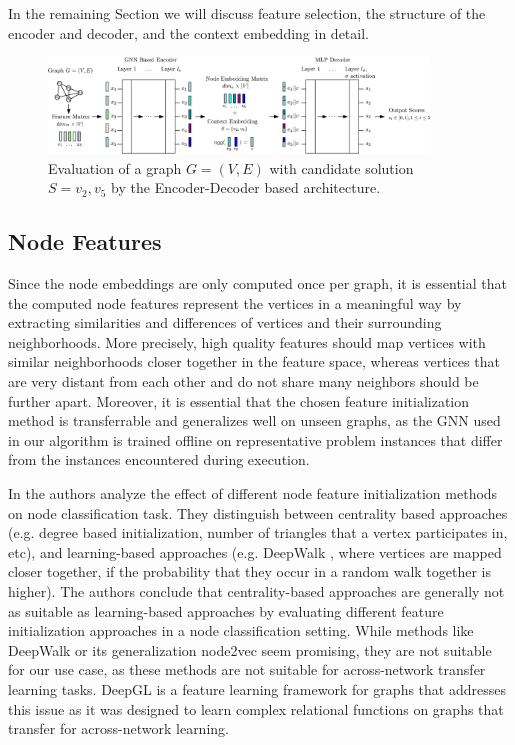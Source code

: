 \documentclass[draft,final]{vutinfth} %
\begin{document}
In the remaining Section we will discuss feature selection, the structure of the encoder and decoder, and the context embedding in detail. 

\begin{figure}
    \centering
    \includegraphics[width=0.9\textwidth]{graphics/gnn-architecture.eps}
    \caption{Evaluation of a graph $G = (V, E)$ with candidate solution $S = {v_2, v_5}$ by the Encoder-Decoder based architecture. }
    \label{fig:gnn-architecture}
\end{figure}

\subsection{Node Features}
Since the node embeddings are only computed once per graph, it is essential that the computed node features represent the vertices in a meaningful way by extracting similarities and differences of vertices and their surrounding neighborhoods. More precisely, high quality features should map vertices with similar neighborhoods closer together in the feature space, whereas vertices that are very distant from each other and do not share many neighbors should be further apart. Moreover, it is essential that the chosen feature initialization method is transferrable and generalizes well on unseen graphs, as the GNN used in our algorithm is trained offline on representative problem instances that differ from the instances encountered during execution. 

In \cite{Duong2019} the authors analyze the effect of different node feature initialization methods on node classification task. They distinguish between centrality based approaches (e.g. degree based initialization, number of triangles that a vertex participates in, etc), and learning-based approaches (e.g. DeepWalk \cite{Perozzi2014}, where vertices are mapped closer together, if the probability that they occur in a random walk together is higher). 
The authors conclude that centrality-based approaches are generally not as suitable as learning-based approaches by evaluating different feature initialization approaches in a node classification setting. While methods like DeepWalk or its generalization node2vec \cite{GroverL16} seem promising, they are not suitable for our use case, as these methods are not suitable for across-network transfer learning tasks. DeepGL \cite{Rossi17a} is a feature learning framework for graphs that addresses this issue as it was designed to learn complex relational functions on graphs that transfer for across-network learning. 
\end{document}
